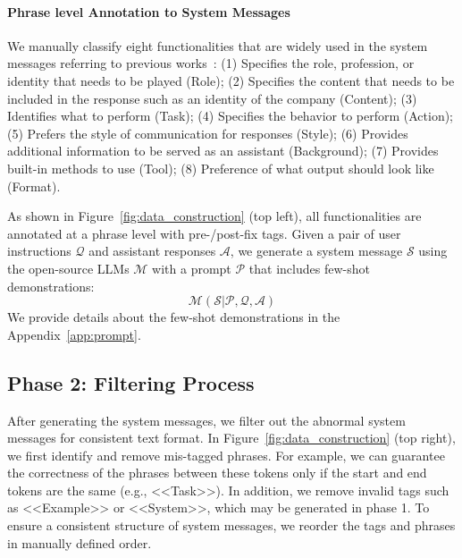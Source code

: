 \paragraph{Phrase level Annotation to System Messages}
We manually classify eight functionalities that are widely used in the system messages referring to previous works~\citep{openai2024function, cohere2024, alkhamissi2024investigating,lee2024aligning}: 
(1) Specifies the role, profession, or identity that needs to be played (Role);
(2) Specifies the content that needs to be included in the response such as an identity of the company (Content);
(3) Identifies what to perform (Task);
(4) Specifies the behavior to perform (Action);
(5) Prefers the style of communication for responses (Style);
(6) Provides additional information to be served as an assistant (Background);
(7) Provides built-in methods to use (Tool); 
(8) Preference of what output should look like (Format).


As shown in Figure~\ref{fig:data_construction} (top left), all functionalities are annotated at a phrase level with pre-/post-fix tags. 
Given a pair of user instructions $\mathcal{Q}$ and assistant responses $\mathcal{A}$, we generate a system message $\mathcal{S}$ using the open-source LLMs $\mathcal{M}$ with a prompt $\mathcal{P}$ that includes few-shot demonstrations:
\begin{equation}
    \mathcal{M}(\mathcal{S}|\mathcal{P},\mathcal{Q},\mathcal{A})
\end{equation}
We provide details about the few-shot demonstrations in the Appendix~\ref{app:prompt}.


\subsection{Phase 2: Filtering Process}
\label{sysgen:filtering}
After generating the system messages, we filter out the abnormal system messages for consistent text format.
In Figure~\ref{fig:data_construction} (top right), we first identify and remove mis-tagged phrases.
For example, we can guarantee the correctness of the phrases between these tokens only if the start and end tokens are the same (e.g., <<Task>>).
In addition, we remove invalid tags such as <<Example>> or <<System>>, which may be generated in phase 1.
To ensure a consistent structure of system messages, we reorder the tags and phrases in manually defined order.

